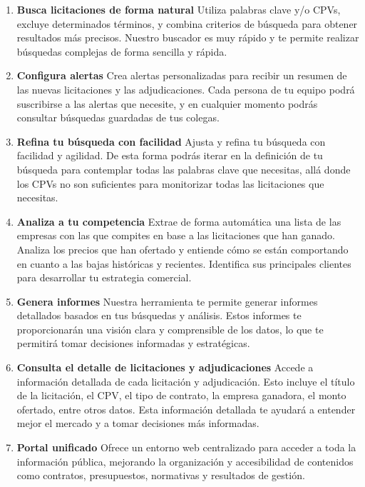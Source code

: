\documentclass{article}
\begin{document}
\begin{enumerate}

    \item \textbf{Busca licitaciones de forma natural}
    \newline
    Utiliza palabras clave y/o CPVs, excluye determinados términos, y combina criterios de búsqueda para obtener resultados más precisos. Nuestro buscador es muy rápido y te permite realizar búsquedas complejas de forma sencilla y rápida.
    
    \item \textbf{Configura alertas}
    \newline
    Crea alertas personalizadas para recibir un resumen de las nuevas licitaciones y las adjudicaciones. Cada persona de tu equipo podrá suscribirse a las alertas que necesite, y en cualquier momento podrás consultar búsquedas guardadas de tus colegas.
    
    \item \textbf{Refina tu búsqueda con facilidad}
    \newline
    Ajusta y refina tu búsqueda con facilidad y agilidad. De esta forma podrás iterar en la definición de tu búsqueda para contemplar todas las palabras clave que necesitas, allá donde los CPVs no son suficientes para monitorizar todas las licitaciones que necesitas.
    
    \item \textbf{Analiza a tu competencia}
    \newline
    Extrae de forma automática una lista de las empresas con las que compites en base a las licitaciones que han ganado. Analiza los precios que han ofertado y entiende cómo se están comportando en cuanto a las bajas históricas y recientes. Identifica sus principales clientes para desarrollar tu estrategia comercial.
    
    \item \textbf{Genera informes}
    \newline
    Nuestra herramienta te permite generar informes detallados basados en tus búsquedas y análisis. Estos informes te proporcionarán una visión clara y comprensible de los datos, lo que te permitirá tomar decisiones informadas y estratégicas.
    
    \item \textbf{Consulta el detalle de licitaciones y adjudicaciones}
    \newline
    Accede a información detallada de cada licitación y adjudicación. Esto incluye el título de la licitación, el CPV, el tipo de contrato, la empresa ganadora, el monto ofertado, entre otros datos. Esta información detallada te ayudará a entender mejor el mercado y a tomar decisiones más informadas.

    \item \textbf{Portal unificado}
    \newline
    Ofrece un entorno web centralizado para acceder a toda la información pública, mejorando la organización y accesibilidad de contenidos como contratos, presupuestos, normativas y resultados de gestión.
\end{enumerate}
\end{document}

